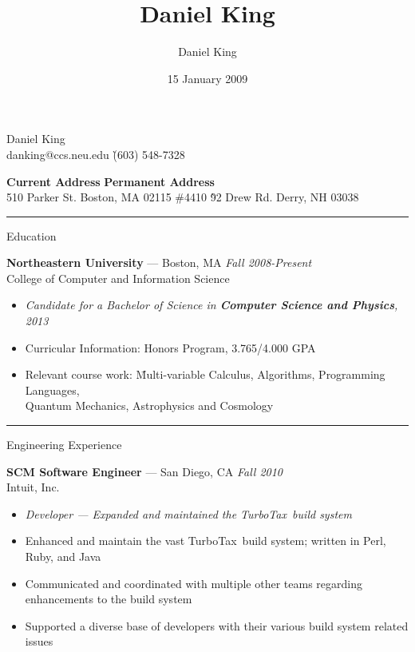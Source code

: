 \documentclass[10pt]{letter}
\author{Daniel King}
\title{Daniel King}
\date{15 January 2009}
\begin{document}
\begin{tabbing}{\Huge Daniel King} \\
\normalsize danking@ccs.neu.edu \`(603) 548-7328
\end{tabbing}

\vspace{-10pt}
\begin{tabbing}
\textbf{Current Address} \`\textbf{Permanent Address}\\
510 Parker St. Boston, MA 02115 \#4410 \`92 Drew Rd. Derry, NH 03038
\end{tabbing}\vspace{-15pt}
\rule{\linewidth}{.5pt}

{\Large Education}
\begin{tabbing}
{\large \bf Northeastern University} --- Boston, MA \` \textit{Fall 2008-Present} \\
College of Computer and Information Science
\end{tabbing}\vspace{-15pt}

\begin{itemize}
\setlength\itemsep{1pt}
\item[] \textit{Candidate for a Bachelor of Science in \textbf{Computer Science and Physics}, 2013}
\item Curricular Information:\hspace{.2in} Honors Program, 3.765/4.000 GPA
\item \begin{tabbing}Relevant course work:\hspace{.3in}
  \=Multi-variable Calculus, Algorithms, Programming Languages, \\
  \>Quantum Mechanics, Astrophysics and Cosmology\end{tabbing}
\end{itemize}

\rule{\linewidth}{.5pt}

{\Large Engineering Experience}
\begin{tabbing}
{\large \bf SCM Software Engineer} --- San Diego, CA \` \textit{Fall 2010} \\
Intuit, Inc.

\end{tabbing}\vspace{-10pt}

\begin{itemize}
\setlength\itemsep{1pt}
\item [] \textit{Developer --- Expanded and maintained the TurboTax\textsuperscript{\textregistered}~build system}
\item Enhanced and maintain the vast TurboTax\textsuperscript{\textregistered}~build system; written in Perl, Ruby, and Java
\item Communicated and coordinated with multiple other teams regarding enhancements to the build system
\item Supported a diverse base of developers with their various build system related issues
\end{itemize}
\end{document}
